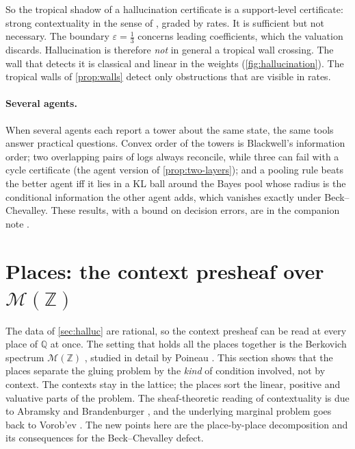 \documentclass[11pt]{article}
\theoremstyle{definition}
\begin{document}
So the tropical shadow of a hallucination certificate is a support-level certificate: strong contextuality in the sense of
\cite{AbramskyBrandenburger2011}, graded by rates. It is sufficient but not necessary. The boundary $\varepsilon=\tfrac13$ concerns leading
coefficients, which the valuation discards. Hallucination is therefore \emph{not} in general a tropical wall crossing. The wall that
detects it is classical and linear in the weights (\cref{fig:hallucination}). The tropical walls of \cref{prop:walls} detect only
obstructions that are visible in rates.

\FloatBarrier
\paragraph{Several agents.} When several agents each report a tower about the same state, the same tools answer practical questions.
Convex order of the towers is Blackwell's information order; two overlapping pairs of logs always reconcile, while three can fail with a
cycle certificate (the agent version of \cref{prop:two-layers}); and a pooling rule beats the better agent iff it lies in a KL ball
around the Bayes pool whose radius is the conditional information the other agent adds, which vanishes exactly under Beck--Chevalley.
These results, with a bound on decision errors, are in the companion note \cite{PoolingNote2}.

\section{Places: the context presheaf over $\mathcal{M}(\mathbb{Z})$}\label{sec:places}
The data of \cref{sec:halluc} are rational, so the context presheaf can be read at every place of $\mathbb{Q}$ at once. The setting
that holds all the places together is the Berkovich spectrum $\mathcal{M}(\mathbb{Z})$ \cite[Ex.~1.4.1]{Berkovich1990}, studied in
detail by Poineau \cite{Poineau2010}. This section shows that the places separate the gluing problem by the \emph{kind} of condition
involved, not by context. The contexts stay in the lattice; the places sort the linear, positive and valuative parts of the
problem. The sheaf-theoretic reading of contextuality is due to Abramsky and Brandenburger \cite{AbramskyBrandenburger2011}, and the
underlying marginal problem goes back to Vorob'ev \cite{Vorobev1962}. The new points here are the place-by-place decomposition and its
consequences for the Beck--Chevalley defect.
\end{document}
